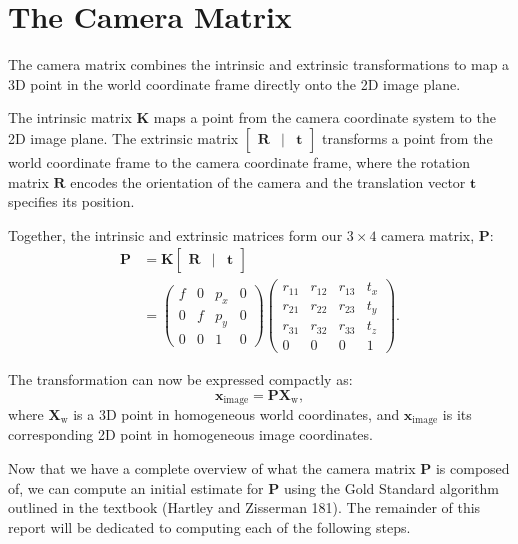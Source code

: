 \documentclass[12pt]{article}
\begin{document}
\section{The Camera Matrix}

The camera matrix combines the intrinsic and extrinsic transformations to map a 3D point in the world coordinate frame directly onto the 2D image plane.

The intrinsic matrix $\mathbf{K}$ maps a point from the camera coordinate system to the 2D image plane. The extrinsic matrix $\begin{bmatrix} \mathbf{R} & | & \mathbf{t} \end{bmatrix}$ transforms a point from the world coordinate frame to the camera coordinate frame, where the rotation matrix $\mathbf{R}$ encodes the orientation of the camera and the translation vector $\mathbf{t}$ specifies its position.

Together, the intrinsic and extrinsic matrices form our $3\times 4$ camera matrix, $\mathbf{P}$:
\begin{align*}
    \mathbf{P} &= \mathbf{K} \begin{bmatrix} \mathbf{R} & | & \mathbf{t} \end{bmatrix} \\
    &= \begin{pmatrix}
        f & 0 & p_x & 0 \\
        0 & f & p_y & 0 \\
        0 & 0 & 1 & 0
    \end{pmatrix}
    \begin{pmatrix}
        r_{11} & r_{12} & r_{13} & t_x \\
        r_{21} & r_{22} & r_{23} & t_y \\
        r_{31} & r_{32} & r_{33} & t_z \\
        0 & 0 & 0 & 1
    \end{pmatrix}.
\end{align*}

The transformation can now be expressed compactly as:
$$
\mathbf{x}_{\text{image}} = \mathbf{P} \mathbf{X}_{\text{w}},
$$
where $\mathbf{X}_{\text{w}}$ is a 3D point in homogeneous world coordinates, and $\mathbf{x}_{\text{image}}$ is its corresponding 2D point in homogeneous image coordinates.

Now that we have a complete overview of what the camera matrix $ \mathbf{P} $ is composed of, we can compute an initial estimate for $ \mathbf{P} $ using the Gold Standard algorithm outlined in the textbook (Hartley and Zisserman 181). The remainder of this report will be dedicated to computing each of the following steps.
\end{document}
